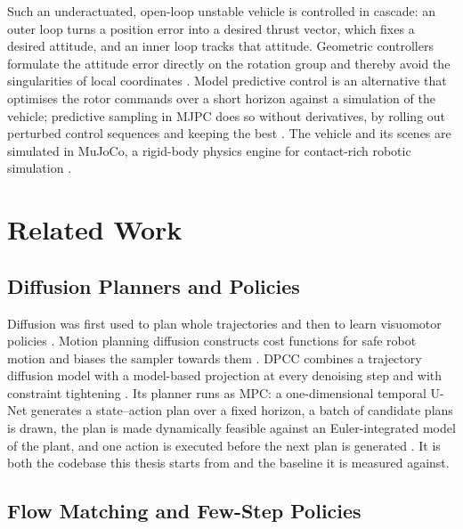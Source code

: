 \documentclass[headsepline,footsepline,footinclude=false,oneside,fontsize=11pt,paper=a4,listof=totoc,bibliography=totoc]{scrbook}
\theoremstyle{definition}
\theoremstyle{plain}
\theoremstyle{remark}
\begin{document}
Such an underactuated, open-loop unstable vehicle is
controlled in cascade: an outer loop turns a position error into a desired thrust vector, which fixes a
desired attitude, and an inner loop tracks that attitude. Geometric controllers formulate the attitude
error directly on the rotation group and thereby avoid the singularities of local coordinates
\parencite{lee2010geometric}. Model predictive control is an alternative that optimises the rotor
commands over a short horizon against a simulation of the vehicle; predictive sampling in \ac{MJPC}
does so without derivatives, by rolling out perturbed control sequences and keeping the best
\parencite{howell2022predictive}. The vehicle and its scenes are simulated in MuJoCo, a rigid-body
physics engine for contact-rich robotic simulation \parencite{todorov2012mujoco}.

\chapter{Related Work}\label{ch:related}

\section{Diffusion Planners and Policies}\label{sec:rel:diffusion}

Diffusion was first used to plan whole trajectories \parencite{janner2022planning} and then to learn
visuomotor policies \parencite{chi2023diffusion}. Motion planning diffusion constructs cost functions
for safe robot motion and biases the sampler towards them \parencite{carvalho2025motion}. \ac{DPCC}
combines a trajectory diffusion model with a model-based projection at every denoising step and with
constraint tightening \parencite{romer2025diffusion}. Its planner runs as \ac{MPC}: a one-dimensional
temporal U-Net generates a state--action plan over a fixed horizon, a batch of candidate plans is
drawn, the plan is made dynamically feasible against an Euler-integrated model of the plant, and one
action is executed before the next plan is generated \parencite[Sec.~5]{romer2025diffusion}. It is
both the codebase this thesis starts from and the baseline it is measured against.

\section{Flow Matching and Few-Step Policies}\label{sec:rel:fm}
\end{document}
